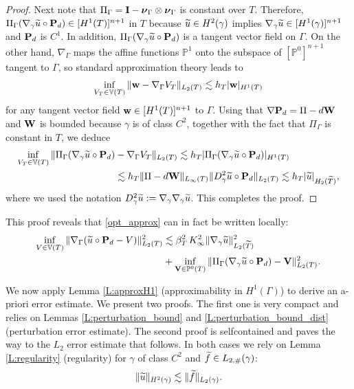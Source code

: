 \begin{proof}
Next note that $\Pi_\Gamma = {\bf I} - {\boldsymbol \nu}_\Gamma\otimes{\boldsymbol \nu}_\Gamma$ is constant
over $T$. Therefore, $\Pi_\Gamma (\nabla_\gamma \widetilde{u} \circ {\bf P}_d) \in [H^1(T)]^{n+1}$
in $T$ because $\widetilde{u} \in H^2(\gamma)$ implies $\nabla_\gamma \widetilde{u} \in [H^1(\gamma)]^{n+1}$
and ${\bf P}_d$ is $C^1$.  In addition, $\Pi_\Gamma (\nabla_\gamma \widetilde{u} \circ {\bf P}_d)$
is a tangent vector field on $\Gamma$.  On the other hand, $\nabla_\Gamma$
maps the affine functions $\mathbb{P}^1$ onto the subspace of $[\mathbb{P}^0]^{n+1}$
tangent to $\Gamma$, so standard approximation theory leads to
%
$$
\inf_{V_T \in \mathbb{V}(T)} \|{\bf w}-\nabla_\Gamma V_T\|_{L_2(T)} \lesssim h_T |{\bf w}|_{H^1(T)}
$$
%
for any tangent vector field ${\bf w} \in [H^1(T)]^{n+1}$ to $\Gamma$.  Using that
$\nabla {\bf P}_d = \Pi-d {\bf W}$ and ${\bf W}$ is bounded because $\gamma$ is of class $C^2$,
together with the fact that $\Pi_\Gamma$ is constant in $T$, we deduce
%
\begin{align*} 
\inf_{V_T \in \mathbb{V}(T)}  \|\Pi_\Gamma (\nabla_\gamma \widetilde{u} \circ {\bf P}_d)&-\nabla_\Gamma V_T\|_{L_2(T)} \lesssim h_T |\Pi_\Gamma (\nabla_\gamma \widetilde{u} \circ {\bf P}_d)|_{H^1(T)}
\\ &  \lesssim h_T \|\Pi-d{\bf W}\|_{L_\infty(T)} \|D_\gamma^2 \widetilde{u} \circ {\bf P}_d\|_{L_2(T)} 
 \lesssim h_T |\widetilde{u}|_{H_2(\widetilde{T})},
\end{align*}
%
where we used the notation $D^2_\gamma  \widetilde{u} := \nabla_\gamma \nabla_\gamma  \widetilde{u}$.
%
This completes the proof.
\end{proof}

This proof reveals that \eqref{opt_approx} can in fact be written locally:   
%
\begin{align*}
\inf_{V \in \mathbb{V}(T)} \|\nabla_\Gamma(\widetilde{u} \circ {\bf P}_d -V)\|_{L_2(T)}^2
&\lesssim \beta_T^2 \, K_\infty^2 \|\nabla_\gamma \widetilde{u}\|_{L_2(\widetilde{T})}^2
\\
& + \inf_{{\bf V} \in \mathbb{P}^0(T)}  \|\Pi_\Gamma (\nabla_\gamma \widetilde{u} \circ {\bf P}_d)
- {\bf V} \|_{L_2(T)}^2.
\end{align*}
%

We now apply Lemma \ref{L:approxH1} (approximability in $H^1(\Gamma)$) to derive an
a-priori error estimate. We present two proofs. The first one is very compact and
relies on Lemmas \ref{L:perturbation_bound} and \ref{L:perturbation_bound_dist}
(perturbation error estimate).
The second proof is selfcontained and paves the way to the $L_2$ error estimate
that follows. In both cases we rely on Lemma \ref{L:regularity} (regularity)
for $\gamma$ of class $C^2$ and $\widetilde{f} \in L_{2,\#}(\gamma)$:
%
$$
\| \widetilde{u} \|_{H^2(\gamma)} \lesssim \| \widetilde{f} \|_{L_2(\gamma)}.
$$
%

